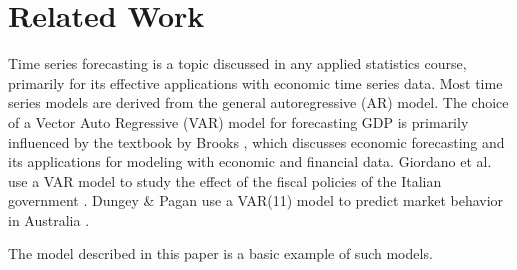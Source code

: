 \section{Related Work}

Time series forecasting is a topic discussed in any applied statistics course, 
primarily for its effective applications with economic time series data.  Most 
time series models are derived from the general 
autoregressive (AR) model. The choice of a Vector Auto Regressive (VAR) 
model for forecasting GDP is primarily influenced by
the textbook by Brooks \cite{brooks}, which discusses economic forecasting and 
its applications for modeling with economic and financial data. 
Giordano et al. use a VAR model to study the effect of the fiscal policies of
the Italian government \cite{giordano}.
Dungey \& Pagan use a VAR(11) model to predict market behavior
in Australia \cite{dungey}.  

The model described in this paper is a basic example of such models.
